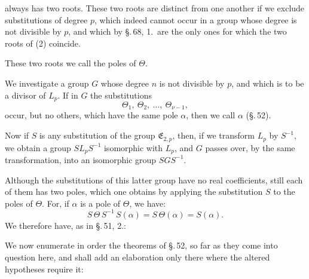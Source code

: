 always has two roots. These two roots are distinct from one another
if we exclude substitutions of degree $p$, which indeed cannot occur
in a group whose degree is not divisible by $p$, and which by
\S.\,68, 1.\ are the only ones for which the two roots of (2)
coincide.

These two roots we call the poles of $\Theta$.

We investigate a group $G$ whose degree $n$ is not divisible by $p$,
and which is to be a divisor of $L_p$. If in $G$ the substitutions
\[
\Theta_1,\ \Theta_2,\ \ldots,\ \Theta_{\nu-1},
\]
occur, but no others, which have the same pole $\alpha$, then we
call $\alpha$  (\S.\,52).

Now if $S$ is any substitution of the group $\mathfrak{E}_{2,p}$, then,
if we transform $L_p$ by $S^{-1}$, we obtain a group $S L_p S^{-1}$
isomorphic with $L_p$, and $G$ passes over, by the same
transformation, into an isomorphic group $S G S^{-1}$.

Although the substitutions of this latter group have no real
coefficients, still each of them has two poles, which one obtains
by applying the substitution $S$ to the poles of $\Theta$. For, if
$\alpha$ is a pole of $\Theta$, we have:
\[
S\,\Theta\,S^{-1}\,S(\alpha) = S\,\Theta(\alpha) = S(\alpha).
\]
We therefore have, as in \S.\,51, 2.:


We now enumerate in order the theorems of \S.\,52, so far as they
come into question here, and shall add an elaboration only there
where the altered hypotheses require it:

